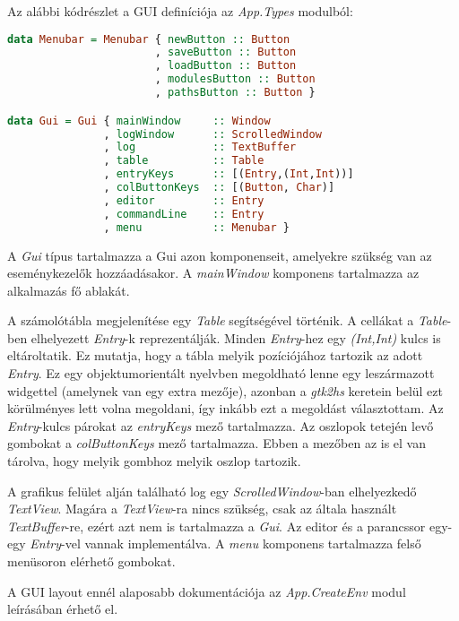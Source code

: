 Az alábbi kódrészlet a GUI definíciója az \textit{App.Types} modulból:

\begin{lstlisting}[language={Haskell}]
data Menubar = Menubar { newButton :: Button
                       , saveButton :: Button
                       , loadButton :: Button
                       , modulesButton :: Button
                       , pathsButton :: Button }

data Gui = Gui { mainWindow     :: Window
               , logWindow      :: ScrolledWindow
               , log            :: TextBuffer
               , table          :: Table
               , entryKeys      :: [(Entry,(Int,Int))]
               , colButtonKeys  :: [(Button, Char)]
               , editor         :: Entry
               , commandLine    :: Entry
               , menu           :: Menubar }
\end{lstlisting}

A \textit{Gui} típus tartalmazza a Gui azon komponenseit, amelyekre szükség van az eseménykezelők hozzáadásakor. A \textit{mainWindow} komponens tartalmazza az alkalmazás fő ablakát. 

A számolótábla megjelenítése egy \textit{Table} segítségével történik. A cellákat a \textit{Table}-ben elhelyezett \textit{Entry}-k reprezentálják. Minden \textit{Entry}-hez egy \textit{(Int,Int)} kulcs is eltároltatik. Ez mutatja, hogy a tábla melyik pozíciójához tartozik az adott \textit{Entry}. Ez egy objektumorientált nyelvben megoldható lenne egy leszármazott widgettel (amelynek van egy extra mezője), azonban a \textit{gtk2hs} keretein belül ezt körülményes lett volna megoldani, így inkább ezt a megoldást választottam. Az \textit{Entry}-kulcs párokat az \textit{entryKeys} mező tartalmazza. Az oszlopok tetején levő gombokat a \textit{colButtonKeys} mező tartalmazza. Ebben a mezőben az is el van tárolva, hogy melyik gombhoz melyik oszlop tartozik.

A grafikus felület alján található log egy \textit{ScrolledWindow}-ban elhelyezkedő \textit{TextView}. Magára a \textit{TextView}-ra nincs szükség, csak az általa használt \textit{TextBuffer}-re, ezért azt nem is tartalmazza a \textit{Gui}. Az editor és a parancssor egy-egy \textit{Entry}-vel vannak implementálva. A \textit{menu} komponens tartalmazza felső menüsoron elérhető gombokat. 

A GUI layout ennél alaposabb dokumentációja az \textit{App.CreateEnv} modul leírásában érhető el. 

